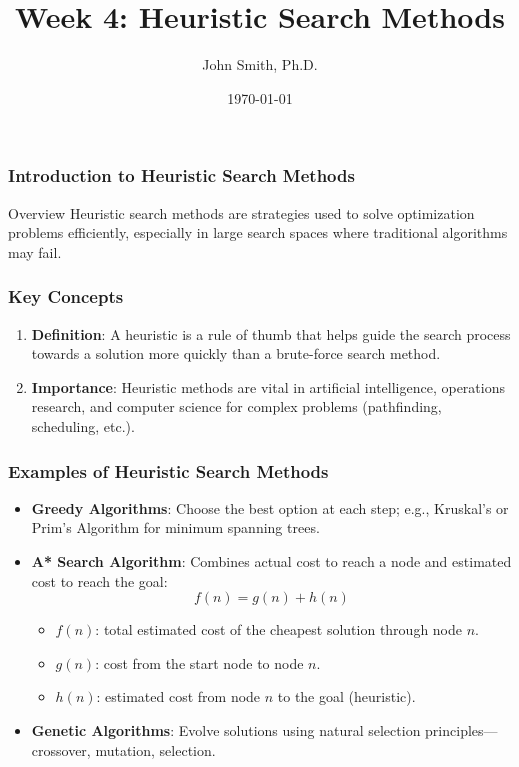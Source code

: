 \documentclass[aspectratio=169]{beamer}
\title[Heuristic Search Methods]{Week 4: Heuristic Search Methods}
\author[J. Smith]{John Smith, Ph.D.}
\institute[University Name]{
  Department of Computer Science\\
  University Name\\
  \vspace{0.3cm}
  Email: email@university.edu\\
  Website: www.university.edu
}
\date{\today}
\begin{document}
\frame{\titlepage}

\begin{frame}[fragile]
    \frametitle{Introduction to Heuristic Search Methods}
    \begin{block}{Overview}
        Heuristic search methods are strategies used to solve optimization problems efficiently, especially in large search spaces where traditional algorithms may fail.
    \end{block}
\end{frame}

\begin{frame}[fragile]
    \frametitle{Key Concepts}
    \begin{enumerate}
        \item \textbf{Definition}: A heuristic is a rule of thumb that helps guide the search process towards a solution more quickly than a brute-force search method.
        \item \textbf{Importance}: Heuristic methods are vital in artificial intelligence, operations research, and computer science for complex problems (pathfinding, scheduling, etc.).
    \end{enumerate}
\end{frame}

\begin{frame}[fragile]
    \frametitle{Examples of Heuristic Search Methods}
    \begin{itemize}
        \item \textbf{Greedy Algorithms}: Choose the best option at each step; e.g., Kruskal’s or Prim’s Algorithm for minimum spanning trees.
        \item \textbf{A* Search Algorithm}: Combines actual cost to reach a node and estimated cost to reach the goal:
        \begin{equation}
            f(n) = g(n) + h(n)
        \end{equation}
        \begin{itemize}
            \item \( f(n) \): total estimated cost of the cheapest solution through node \( n \).
            \item \( g(n) \): cost from the start node to node \( n \).
            \item \( h(n) \): estimated cost from node \( n \) to the goal (heuristic).
        \end{itemize}
        \item \textbf{Genetic Algorithms}: Evolve solutions using natural selection principles—crossover, mutation, selection.
    \end{itemize}
\end{frame}
\end{document}
